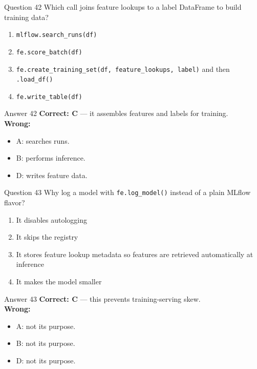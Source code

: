 \documentclass[aspectratio=169,11pt]{beamer}
\begin{document}
	\begin{frame}{Question 42}
		Which call joins feature lookups to a label DataFrame to build training data?
		\begin{enumerate}[label=\Alph*.]
			\item \texttt{mlflow.search\_runs(df)}
			\item \texttt{fe.score\_batch(df)}
			\item \texttt{fe.create\_training\_set(df, feature\_lookups, label)} and then \texttt{.load\_df()}
			\item \texttt{fe.write\_table(df)}
		\end{enumerate}
	\end{frame}
	\begin{frame}{Answer 42}
		\textbf{Correct: C} --- it assembles features and labels for training.\\
		\vspace{0.5em}
		\textbf{Wrong:}
		\begin{itemize}
			\item A: searches runs.
			\item B: performs inference.
			\item D: writes feature data.
		\end{itemize}
	\end{frame}
	
	\begin{frame}{Question 43}
		Why log a model with \texttt{fe.log\_model()} instead of a plain MLflow flavor?
		\begin{enumerate}[label=\Alph*.]
			\item It disables autologging
			\item It skips the registry
			\item It stores feature lookup metadata so features are retrieved automatically at inference
			\item It makes the model smaller
		\end{enumerate}
	\end{frame}
	\begin{frame}{Answer 43}
		\textbf{Correct: C} --- this prevents training-serving skew.\\
		\vspace{0.5em}
		\textbf{Wrong:}
		\begin{itemize}
			\item A: not its purpose.
			\item B: not its purpose.
			\item D: not its purpose.
		\end{itemize}
	\end{frame}
	
\end{document}
